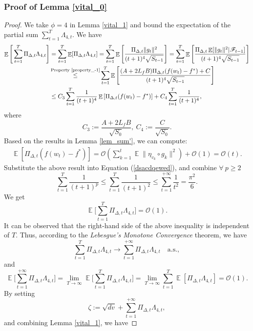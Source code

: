 \documentclass{article} %
\DeclareMathOperator{\Expect}{\mathbb{E}}
\begin{document}
\subsubsection{Proof of Lemma \ref{vital_0}}
\begin{proof}
We take $\phi = 4$ in Lemma \ref{vital_1} and bound the expectation of the partial sum $\sum_{t=1}^{T}\Lambda_{4,t}$. We have
\begin{align}\label{dsacdqewed}
\Expect\Bigg[\sum_{t=1}^{T}\Pi_{\Delta,t}\Lambda_{4,t}\Bigg]&=\sum_{t=1}^{T}\Expect[\Pi_{\Delta,t}\Lambda_{4,t}]=\sum_{t=1}^{T}\Expect\Bigg[\frac{\Pi_{\Delta,t}\|g_{t}\|^{2}}{(t+1)^{4}\sqrt{S_{t-1}}}\Bigg]=\sum_{t=1}^{T}\Expect\Bigg[\frac{\Pi_{\Delta,t}\Expect[\|g_{t}\|^{2}|\mathscr{F}_{t-1}]}{(t+1)^{4}\sqrt{S_{t-1}}}\Bigg]\notag\\&\mathop{\le}^{\text{Property \ref{property_-1}}}\sum_{t=1}^{T}\Expect\Bigg[\frac{(A+2L_{f}B)\Pi_{\Delta,t}(f(w_{t})-f^*)+C}{(t+1)^{4}\sqrt{S_{t-1}}}\Bigg]\notag\\&\le C_{3}\sum_{t=1}^{T}\frac{1}{(t+1)^{4}}\Expect\left[\Pi_{\Delta,t}(f(w_{t})-f^*)\right]+C_{4}\sum_{t=1}^{T}\frac{1}{(t+1)^{4}},
\end{align}
where $$C_{3}:=\frac{A+2L_{f}B}{\sqrt{S_{0}}},\ C_{4}:=\frac{C}{\sqrt{S_{0}}}.$$
Based on the results in Lemma \ref{lem_sum'}, we can compute:
\begin{align*}
\Expect\left[\Pi_{\Delta,t}(f(w_{t})-f^*)\right]=\mathcal{O}\left(\sum_{k=1}^{t}\Expect\|\eta_{v_{k}}\circ g_{k}\|^{2}\right)+\mathcal{O}(1)=\mathcal{O}(t).
\end{align*}
Substitute the above result into Equation (\ref{dsacdqewed}), and combine $\forall\ p\ge 2$
\[\sum_{t=1}^{T}\frac{1}{(t+1)^{p}}\le\sum_{t=1}^{T}\frac{1}{(t+1)^{2}}\le \sum_{t=1}^{+\infty}\frac{1}{t^{2}}=\frac{\pi^{2}}{6}.\] We get
\[\Expect\Bigg[\sum_{t=1}^{T}\Pi_{\Delta,t}\Lambda_{4,t}\Bigg]=\mathcal{O}(1).\]
It can be observed that the right-hand side of the above inequality is independent of $T$. Thus, according to the \emph{Lebesgue's Monotone Convergence} theorem, we have 
\[\sum_{t=1}^{T}\Pi_{\Delta,t}\Lambda_{4,t} \to \sum_{t=1}^{+\infty}\Pi_{\Delta,t}\Lambda_{4,t} \quad \text{a.s.},\]
and
\[
\Expect\Bigg[\sum_{t=1}^{+\infty}\Pi_{\Delta,t}\Lambda_{4,t}\Bigg] = \lim_{T \to \infty} \Expect\Bigg[\sum_{t=1}^{T}\Pi_{\Delta,t}\Lambda_{4,t}\Bigg] = \lim_{T \to \infty} \sum_{t=1}^{T} \Expect[\Pi_{\Delta,t}\Lambda_{4,t}] =\mathcal{O}(1).
\]
By setting $$\zeta := \sqrt{dv} + \sum_{t=1}^{+\infty}\Pi_{\Delta,t}\Lambda_{4,t},$$ and combining Lemma \ref{vital_1}, we have

\end{proof}
\end{document}
